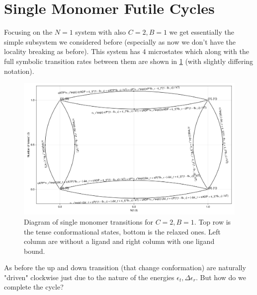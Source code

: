 \documentclass[11pt]{article}
\begin{document}
\section{Single Monomer Futile Cycles}
Focusing on the $N=1$ system with also $C=2,B=1$ we get essentially the simple subsystem we considered before (especially as now we don't have the locality breaking as before).
This system has 4 microstates which along with the full symbolic transition rates between them are shown in \cref{fig:4sTs} (with slightly differing notation).
\begin{figure}[h]
	\includegraphics[width=\textwidth]{../../plots/symgraph_B=1_C=2_N=1_version=2.5.png}
	\caption{
		Diagram of single monomer transitions for $C=2,B=1$.
		Top row is the tense conformational states, bottom is the relaxed ones.
		Left column are without a ligand and right column with one ligand bound.
	}\label{fig:4sTs}
\end{figure}
As before the up and down transition (that change conformation) are naturally "driven" clockwise just due to the nature of the energies $\epsilon_t,\Delta\epsilon_r$.
But how do we complete the cycle?
\end{document}
